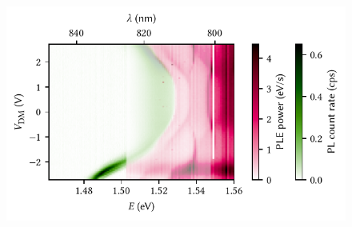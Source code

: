 \begin{figure}
    \centering
    \includegraphics{img/pdf/experiment/doped_M1_05_49-2_ple_single}
    \caption[
        \protect\newline
    ]{
    }
    \label{fig:app:exp:pl:doped_M1_05_49-2_ple}
\end{figure}
